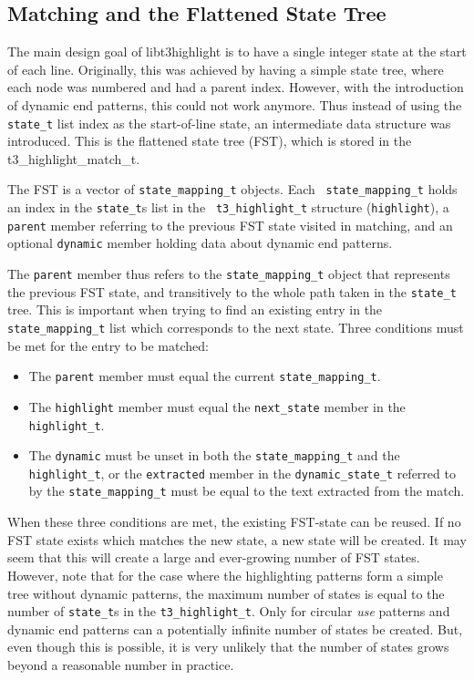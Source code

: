 \documentclass[a4paper]{article}
\newcommand{\state}{{\tt state_t}\xspace}
\newcommand{\highlight}{{\tt highlight_t}\xspace}
\begin{document}
\begin{multicols}{2}
\section{Matching and the Flattened State Tree\label{sec:state-tree}}
The main design goal of libt3highlight is to have a single integer state at the
start of each line. Originally, this was achieved by having a simple state
tree, where each node was numbered and had a parent index. However, with the
introduction of dynamic end patterns, this could not work anymore. Thus instead
of using the \state list index as the start-of-line state, an intermediate
data structure was introduced. This is the flattened state tree (FST), which is
stored in the t3_highlight_match_t.

The FST is a vector of {\tt state_mapping_t} objects. Each {\tt
state_mapping_t} holds an index in the \state{}s list in the {\tt
t3_highlight_t} structure ({\tt highlight}), a {\tt parent} member referring to
the previous FST state visited in matching, and an optional {\tt dynamic}
member holding data about dynamic end patterns.

The {\tt parent} member thus refers to the {\tt state_mapping_t} object that
represents the previous FST state, and transitively to the whole path taken in
the \state tree. This is important when trying to find an existing entry in the
{\tt state_mapping_t} list which corresponds to the next state. Three conditions
must be met for the entry to be matched:

\begin{itemize}
\item The {\tt parent} member must equal the current {\tt state_mapping_t}.
\item The {\tt highlight} member must equal the {\tt next_state} member in the
	\highlight.
\item The {\tt dynamic} must be unset in both the {\tt state_mapping_t} and the
	\highlight, or the {\tt extracted} member in the {\tt dynamic_state_t}
	referred to by the {\tt state_mapping_t} must be equal to the text
	extracted from the match.
\end{itemize}

When these three conditions are met, the existing FST-state can be reused. If
no FST state exists which matches the new state, a new state will be created.
It may seem that this will create a large and ever-growing number of FST states.
However, note that for the case where the highlighting patterns form a simple
tree without dynamic patterns, the maximum number of states is equal to the
number of \state{}s in the {\tt t3_highlight_t}. Only for circular {\it use}
patterns and dynamic end patterns can a potentially infinite number of states
be created. But, even though this is possible, it is very unlikely that the
number of states grows beyond a reasonable number in practice.


\end{multicols}
\end{document}
